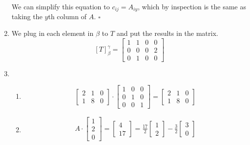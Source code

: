 \documentclass[12pt]{article}
\begin{document}
\begin{enumerate}
            We can simplify this equation to $c_{ij}=A_{iy}$,
            which by inspection is the same as taking the $y$th column of $A$. $\square$
      \item We plug in each element in $\beta$ to $T$ and put the results in the matrix.
            \[[T]^\gamma_\beta = \begin{bmatrix}
                        1 & 1 & 0 & 0 \\
                        0 & 0 & 0 & 2 \\
                        0 & 1 & 0 & 0
                  \end{bmatrix}\]
      \item \begin{enumerate}
                  \item \[\begin{bmatrix}
                                    2 & 1 & 0 \\
                                    1 & 8 & 0
                              \end{bmatrix} \cdot \begin{bmatrix}
                                    1 & 0 & 0 \\
                                    0 & 1 & 0 \\
                                    0 & 0 & 1
                              \end{bmatrix}=\begin{bmatrix}
                                    2 & 1 & 0 \\
                                    1 & 8 & 0
                              \end{bmatrix}\]
                  \item \begin{gather*}
                              A \cdot \begin{bmatrix}1 \\ 2 \\ 0\end{bmatrix} = \begin{bmatrix}4 \\ 17\end{bmatrix} = \frac{17}{2}\begin{bmatrix}1 \\ 2\end{bmatrix}-\frac{3}{2}\begin{bmatrix}3 \\ 0\end{bmatrix} \\

\end{gather*}
\end{enumerate}
\end{enumerate}
\end{document}
